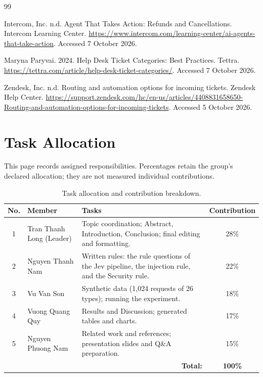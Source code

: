 \documentclass[sigconf,nonacm]{acmart}
\begin{document}
\begin{thebibliography}{99}
\balance

Intercom, Inc. n.d.
 Agent That Takes Action: Refunds and Cancellations.
\newblock Intercom Learning Center. \url{https://www.intercom.com/learning-center/ai-agents-that-take-action}. Accessed 7 October 2026.

Maryna Paryvai. 2024.
\newblock Help Desk Ticket Categories: Best Practices.
\newblock Tettra. \url{https://tettra.com/article/help-desk-ticket-categories/}. Accessed 7 October 2026.

Zendesk, Inc. n.d.
\newblock Routing and automation options for incoming tickets.
\newblock Zendesk Help Center. \url{https://support.zendesk.com/hc/en-us/articles/4408831658650-Routing-and-automation-options-for-incoming-tickets}. Accessed 5 October 2026.

\end{thebibliography}

\clearpage
\onecolumn
\section*{Task Allocation}

This page records assigned responsibilities. Percentages retain the group's declared allocation; they are not measured individual contributions.

\begin{table}[h]
\centering
\caption{Task allocation and contribution breakdown.}
\renewcommand{\arraystretch}{1.4}
\begin{tabular}{|c|p{4.0cm}|p{8.7cm}|c|}
\hline
\textbf{No.} & \textbf{Member} & \textbf{Tasks} & \textbf{Contribution} \\
\hline
1 & Tran Thanh Long (Leader) & Topic coordination; Abstract, Introduction, Conclusion; final editing and formatting. & 28\% \\
\hline
2 & Nguyen Thanh Nam & Written rules: the rule questions of the Jev pipeline, the injection rule, and the Security rule. & 22\% \\
\hline
3 & Vu Van Son & Synthetic data (1,024 requests of 26 types); running the experiment. & 18\% \\
\hline
4 & Vuong Quang Quy & Results and Discussion; generated tables and charts. & 17\% \\
\hline
5 & Nguyen Phuong Nam & Related work and references; presentation slides and Q\&A preparation. & 15\% \\
\hline
\multicolumn{3}{|r|}{\textbf{Total:}} & \textbf{100\%} \\
\hline
\end{tabular}
\end{table}
\end{document}
